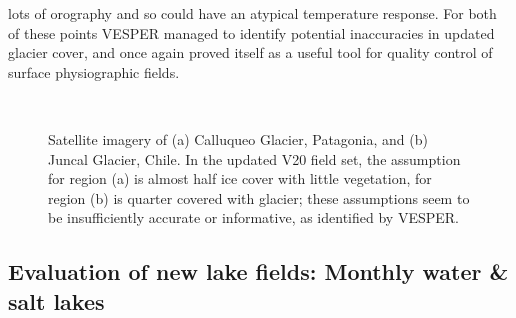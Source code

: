 \documentclass[hess, twostagejnl]{copernicus}
\begin{document}
lots of orography and so could have an atypical temperature response. For both of these points VESPER managed  to identify potential inaccuracies in updated glacier cover, and once again proved itself as a useful tool for quality control of surface physiographic fields. 
	\begin{figure}[h!]
	 \\
	\caption{Satellite imagery of (a) Calluqueo Glacier, Patagonia, and (b) Juncal Glacier, Chile. In the updated V20 field set, the assumption for region (a) is almost half ice cover with little vegetation, for region (b) is quarter covered with glacier; these assumptions seem to be insufficiently accurate or informative, as identified by VESPER.
	} 
	\label{fig:glacier}
\end{figure}


\subsection{Evaluation of new lake fields: Monthly water \& salt lakes}
\end{document}
